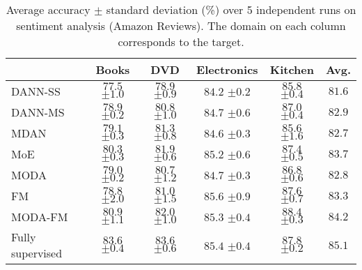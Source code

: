 \begin{table}[]
	\centering
	\footnotesize
	\hspace*{-0.10in}
	\begin{tabular}{l|cccc:c}
		& Books           & DVD             & Electronics     & Kitchen  & Avg. \\ \hline
		DANN-SS \cite{Ganin2015} & $ 77.5 $ \tiny{$ \pm 1.0 $} & $ 78.9 $ \tiny{$ \pm 0.9 $} & $ 84.2 $ \tiny{$ \pm 0.2 $} & $ 85.8 $ \tiny{$ \pm 0.4 $} & $81.6$ \\
		DANN-MS \cite{Ganin2015} & $ 78.9 $ \tiny{$ \pm 0.2 $} & $ 80.8 $ \tiny{$ \pm 1.0 $} & $ 84.7 $ \tiny{$ \pm 0.6 $} & $ 87.0 $ \tiny{$ \pm 0.4 $} & $82.9$ \\
		MDAN \cite{Zhao2018}     & $ 79.1 $ \tiny{$ \pm 0.3 $} & $ 81.3 $ \tiny{$ \pm 0.8 $} & $ 84.6 $ \tiny{$ \pm 0.3 $} & $ 85.6 $ \tiny{$ \pm 1.6 $} & $82.7$ \\
		MoE \cite{Guo2018}      & $ 80.3 $ \tiny{$ \pm 0.3 $} & $ 81.9 $ \tiny{$ \pm 0.6 $} & $ 85.2 $ \tiny{$ \pm 0.6 $} & $ 87.4 $ \tiny{$ \pm 0.5 $} & $83.7$\\ \hline
		MODA     & $ 79.0 $ \tiny{$ \pm 0.2 $} & $ 80.7 $ \tiny{$ \pm 1.2 $} & $ 84.7 $ \tiny{$ \pm 0.3 $} & $ 86.8 $ \tiny{$ \pm 0.6 $} & $82.8$\\
		FM         & $ 78.8 $ \tiny{$ \pm 2.0 $} & $ 81.0 $ \tiny{$ \pm 1.5 $} & $\boldsymbol{85.6}$ \tiny{$\pm 0.9 $} & $ 87.6 $ \tiny{$ \pm 0.7 $} & $83.3$\\
		MODA-FM    & $\boldsymbol{80.9}$ \tiny{$\pm 1.1$} & $\boldsymbol{82.0}$ \tiny{$\pm 1.0$} & $ 85.3 $ \tiny{$ \pm 0.4 $} & $\boldsymbol{88.4}$ \tiny{$\pm 0.3$} & $\boldsymbol{84.2}$\\ \hline
		Fully supervised & $ 83.6 $ \tiny{$ \pm 0.4 $} & $ 83.6 $ \tiny{$ \pm 0.6 $} & $ 85.4 $ \tiny{$ \pm 0.4 $} & $ 87.8 $ \tiny{$ \pm 0.2 $} & $85.1$
	\end{tabular}
	\caption{Average accuracy $\pm$ standard deviation (\%) over 5 independent runs on sentiment analysis (Amazon Reviews). The domain on each column corresponds to the target.}
	\label{tab:amazon_acc}
\end{table}

